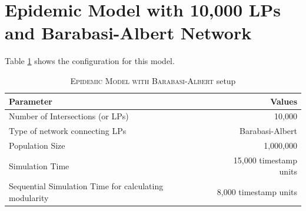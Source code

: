 \documentclass[11pt]{book}
\begin{document}
\clearpage
\section[\textsc{epidemic-ba-10k lp}s]{Epidemic Model with 10,000 LPs and Barabasi-Albert Network}

Table \ref{table:epidemic_10k_ba_config} shows the configuration for this model.

\begin{table}
    \centering
    \begin{tabular}{|| l | r ||}
        \hline
        Parameter                           &   Values\\ [0.5ex]
        \hline\hline
        Number of Intersections (or LPs)    &   10,000\\
        Type of network connecting LPs      &   Barabasi-Albert \cite{barabasi-99}\\
        Population Size                     &   1,000,000\\
        Simulation Time                     &   15,000 timestamp units\\
        Sequential Simulation Time for calculating modularity   &   8,000 timestamp units\\
        \hline
    \end{tabular}
    \caption{\textsc{Epidemic Model with Barabasi-Albert} setup}\label{table:epidemic_10k_ba_config}
\end{table}
\end{document}
